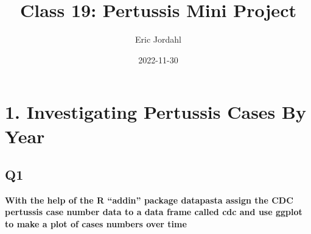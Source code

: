 \documentclass[
  letterpaper,
  DIV=11,
  numbers=noendperiod]{scrartcl}
\title{Class 19: Pertussis Mini Project}
\author{Eric Jordahl}
\date{2022-11-30}
\renewcommand*\contentsname{Table of contents}
\newcommand\contentsname{Table of contents}
\begin{document}
\maketitle
\ifdefined\Shaded\renewenvironment{Shaded}{\begin{tcolorbox}[interior hidden, breakable, enhanced, borderline west={3pt}{0pt}{shadecolor}, frame hidden, sharp corners, boxrule=0pt]}{\end{tcolorbox}}\fi

\renewcommand*\contentsname{Table of contents}
{
\hypersetup{linkcolor=}
\setcounter{tocdepth}{3}
\tableofcontents
}
\hypertarget{investigating-pertussis-cases-by-year}{%
\section{1. Investigating Pertussis Cases By
Year}\label{investigating-pertussis-cases-by-year}}

\hypertarget{q1}{%
\subsection{Q1}\label{q1}}

\textbf{With the help of the R ``addin'' package datapasta assign the
CDC pertussis case number data to a data frame called cdc and use ggplot
to make a plot of cases numbers over time}
\end{document}
